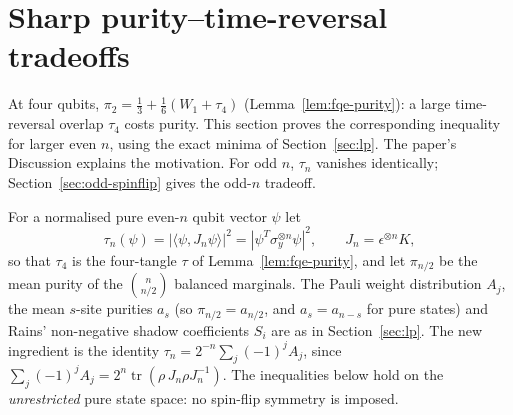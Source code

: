 \section{Sharp purity--time-reversal tradeoffs}\label{sec:spinflip-tradeoffs}

At four qubits, $\pi_2=\tfrac13+\tfrac16(W_1+\tau_4)$ (Lemma~\ref{lem:fqe-purity}): a large time-reversal overlap $\tau_4$ costs purity.
This section proves the corresponding inequality for larger even $n$, using the exact minima of Section~\ref{sec:lp}. The paper's Discussion explains the motivation. For odd $n$, $\tau_n$ vanishes identically; Section~\ref{sec:odd-spinflip} gives the odd-$n$ tradeoff.

For a normalised pure even-$n$ qubit vector $\psi$ let
\[
 \tau_n(\psi)=|\langle\psi,J_n\psi\rangle|^2=|\psi^T\sigma_y^{\otimes n}\psi|^2,
 \qquad J_n=\epsilon^{\otimes n}K,
\]
so that $\tau_4$ is the four-tangle $\tau$ of Lemma~\ref{lem:fqe-purity}, and let
$\pi_{n/2}$ be the mean purity of the $\binom n{n/2}$ balanced marginals. The Pauli weight distribution $A_j$, the mean
$s$-site purities $a_s$ (so $\pi_{n/2}=a_{n/2}$, and $a_s=a_{n-s}$ for pure states) and Rains' non-negative shadow coefficients $S_i$
are as in Section~\ref{sec:lp}. The new ingredient is the identity
$\tau_n=2^{-n}\sum_j(-1)^jA_j$, since $\sum_j(-1)^jA_j=2^n\operatorname{tr}(\rho\,J_n\rho J_n^{-1})$. The inequalities below hold on the
\emph{unrestricted} pure state space: no spin-flip symmetry is imposed.

